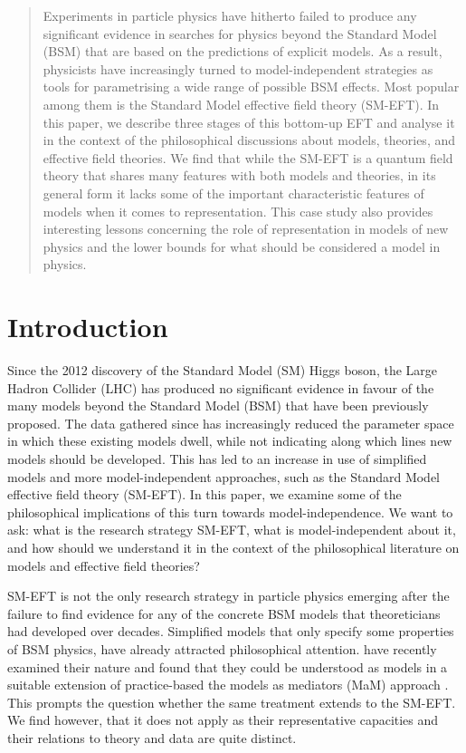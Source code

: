 
\begin{abstract}
Experiments in particle physics have hitherto failed to produce any significant evidence in
searches for physics beyond the Standard Model (BSM) that are based on the predictions of explicit models. 
As a result, physicists have increasingly turned to model-independent strategies as tools for parametrising a wide range of possible BSM effects. Most popular among them is the Standard Model effective field theory (SM-EFT). In this paper, we describe three stages of this bottom-up EFT and analyse it in the context of the philosophical discussions about models, theories, and effective field theories. We find that while the SM-EFT is a quantum field theory that shares many features with both models and theories, in its general form it lacks some of the important characteristic features of models when it comes to representation. This case study also provides interesting lessons concerning the role of representation in models of new physics and the lower bounds for what should be considered a model in physics.
\end{abstract}

\section{Introduction}

Since the 2012 discovery of the Standard Model (SM) Higgs boson, the Large Hadron Collider (LHC) has produced no significant evidence in favour of the many models beyond the Standard Model (BSM) that have been previously proposed. 
The data gathered since has increasingly reduced the parameter space in which these existing models dwell, while not indicating along which lines new models should be developed.
This has led to an increase in use of simplified models and more model-independent approaches, such as the Standard Model effective field theory (SM-EFT). 
In this paper, we examine some of the philosophical implications of this turn towards model-independence.
We want to ask: what is the research strategy SM-EFT, what is model-independent about it, and how should we understand it in the context of the philosophical literature on models and effective field theories?

SM-EFT is not the only research strategy in particle physics emerging after the failure to find evidence for any of the concrete BSM models that theoreticians had developed over decades. 
Simplified models that only specify some properties of BSM physics, have already attracted philosophical attention. 
\citet{mccoymassimi} have recently examined their nature and found that they could be understood as models in a suitable extension of practice-based the models as mediators (MaM) approach \citep{morganmorrison}.
This prompts the question whether the same treatment extends to the SM-EFT. 
We find however, that it does not apply as their representative capacities and their relations to theory and data are quite distinct. 

